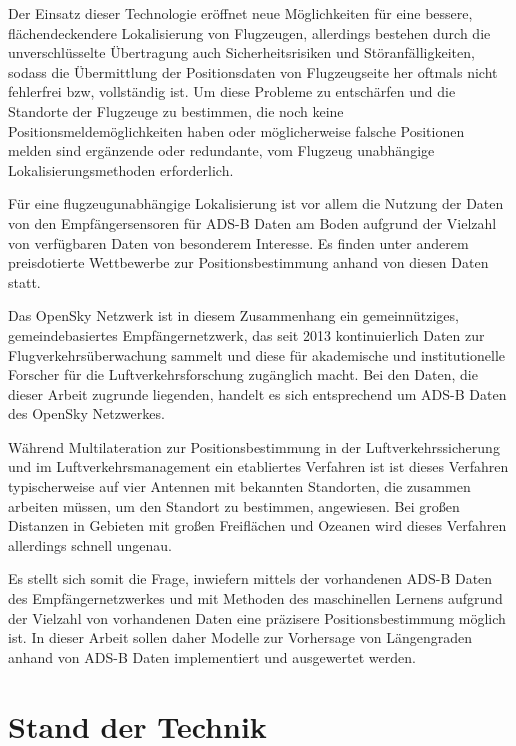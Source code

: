 \documentclass{svproc}
\begin{document}
Der Einsatz dieser Technologie eröffnet neue Möglichkeiten für eine bessere, flächendeckendere Lokalisierung von Flugzeugen, allerdings bestehen durch die unverschlüsselte Übertragung auch Sicherheitsrisiken und Störanfälligkeiten, sodass die Übermittlung der Positionsdaten von Flugzeugseite her oftmals nicht fehlerfrei bzw, vollständig ist. Um diese Probleme zu entschärfen und die Standorte der Flugzeuge zu bestimmen, die noch keine Positionsmeldemöglichkeiten haben oder möglicherweise falsche Positionen melden sind ergänzende oder redundante, vom Flugzeug unabhängige Lokalisierungsmethoden erforderlich. \cite{Adesina2019,competition}

Für eine flugzeugunabhängige Lokalisierung ist vor allem die Nutzung der Daten von den Empfängersensoren für ADS-B Daten am Boden aufgrund der Vielzahl von verfügbaren Daten von besonderem Interesse. Es finden unter anderem preisdotierte Wettbewerbe zur Positionsbestimmung anhand von diesen Daten statt. \cite{competition}

Das OpenSky Netzwerk ist in diesem Zusammenhang ein gemeinnütziges, gemeindebasiertes Empfängernetzwerk, das seit 2013 kontinuierlich Daten zur Flugverkehrsüberwachung sammelt und diese für akademische und institutionelle Forscher für die Luftverkehrsforschung zugänglich macht. \cite{opensky} Bei den Daten, die  dieser Arbeit zugrunde liegenden, handelt es sich entsprechend um ADS-B Daten des OpenSky Netzwerkes.

Während Multilateration  zur Positionsbestimmung in der Luftverkehrssicherung und im Luftverkehrsmanagement ein etabliertes Verfahren ist \cite{meijer2016,competition} ist dieses Verfahren typischerweise auf vier Antennen mit bekannten Standorten, die zusammen arbeiten müssen, um den Standort zu bestimmen, angewiesen. Bei großen Distanzen in Gebieten mit großen Freiflächen und Ozeanen wird dieses Verfahren allerdings schnell ungenau.

Es stellt sich somit die Frage, inwiefern mittels der vorhandenen ADS-B Daten des Empfängernetzwerkes und mit Methoden des maschinellen Lernens aufgrund der Vielzahl von vorhandenen Daten eine präzisere Positionsbestimmung möglich ist. In dieser Arbeit sollen daher Modelle zur Vorhersage von Längengraden anhand von ADS-B Daten implementiert und ausgewertet werden.

\section{Stand der Technik}
\end{document}
